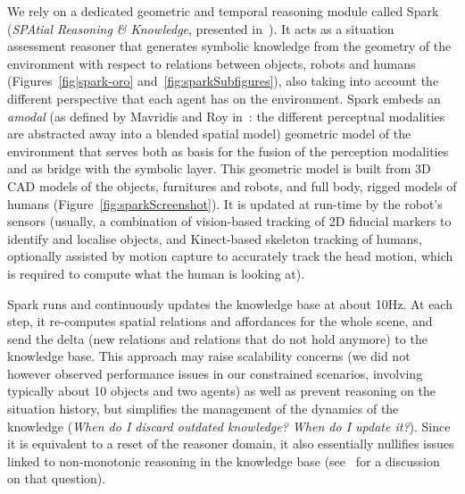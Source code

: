 \documentclass[preprint,3p,times]{elsarticle}
\begin{document}
We rely on a dedicated geometric and temporal reasoning module called {\sc
Spark} (\emph{SPAtial Reasoning \& Knowledge}, presented in~\cite{Sisbot2011}).
It acts as a situation assessment reasoner that generates symbolic knowledge from the
geometry of the environment with respect to relations between objects, robots
and humans (Figures~\ref{fig|spark-oro} and~\ref{fig:sparkSubfigures}), also
taking into account the different perspective that each agent has on the
environment.  {\sc Spark} embeds an \emph{amodal} (as defined by Mavridis and
Roy in~\cite{Mavridis2006}: the different perceptual modalities are abstracted
away into a blended spatial model) geometric model of the environment that
serves both as basis for the fusion of the perception modalities and as bridge
with the symbolic layer. This geometric model is built from 3D CAD models of the
objects, furnitures and robots, and full body, rigged models of humans
(Figure~\ref{fig:sparkScreenshot}).  It is updated at run-time by the robot's
sensors (usually, a combination of vision-based tracking of 2D fiducial markers
to identify and localise objects, and Kinect-based skeleton tracking of humans,
optionally assisted by motion capture to accurately track the head motion, which
is required to compute what the human is looking at).

{\sc Spark} runs and continuously updates the knowledge base at about 10Hz. At
each step, it re-computes spatial relations and affordances for the whole scene,
and send the delta (new relations and relations that do not hold anymore) to the
knowledge base. This approach may raise scalability concerns (we did not however
observed performance issues in our constrained scenarios, involving typically about 10 objects
and two agents) as well as prevent
reasoning on the situation history, but simplifies the management of the
dynamics of the knowledge (\emph{When do I discard outdated knowledge?  When do
I update it?}). Since it is equivalent to a reset of the reasoner domain, it
also essentially nullifies issues linked to non-monotonic reasoning in the
knowledge base (see~\cite{McCarthy2007} for a discussion on that question).
\end{document}
